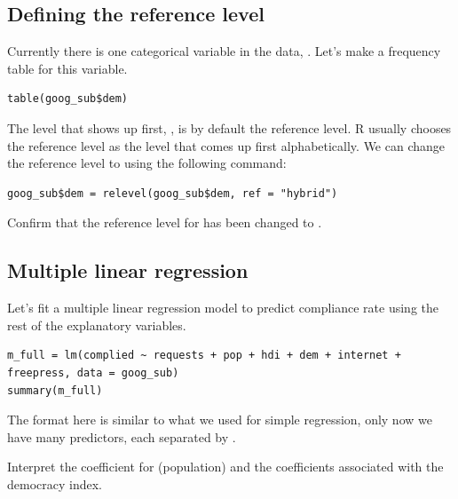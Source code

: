 \documentclass[11pt]{article}
\newcommand{\soln}[1]{ }	%
\begin{document}
\subsection*{Defining the reference level}

Currently there is one categorical variable in the data, . Let's make a frequency table for this variable.

\begin{lstlisting}
table(goog_sub$dem)
\end{lstlisting}

The level that shows up first, , is by default the reference level. R usually chooses the reference level as the level that comes up first alphabetically. We can change the reference level to  using the following command:

\begin{lstlisting}
goog_sub$dem = relevel(goog_sub$dem, ref = "hybrid")
\end{lstlisting}

\begin{exercise}
Confirm that the reference level for  has been changed to .
\end{exercise}
\soln{Yes, not shows up as the first level in the table.}

\subsection*{Multiple linear regression}

Let's fit a multiple linear regression model to predict compliance rate using the rest of the explanatory variables.

\begin{lstlisting}
m_full = lm(complied ~ requests + pop + hdi + dem + internet + freepress, data = goog_sub)
summary(m_full)
\end{lstlisting}

The format here is similar to what we used for simple regression, only now we have many predictors, each separated by \code{+}.

\begin{exercise}
Interpret the coefficient for  (population) and the coefficients associated with the democracy index.
\end{exercise}
\soln{The model predicts a 1.642e-04 percent increase in Google's compliance rate for each additional thousand of population. \\
The model estimates a 1.37\% increase in compliance rate in countries with a flawed democracy, compared to those with a hybrid regime, and 1.007\% increase in compliance rate in countries with full democracy compared to those with a hybrid regime. \\
\textbf{TAs: make sure to mention that the coefficients always compare to the reference level.}}
\end{document}
